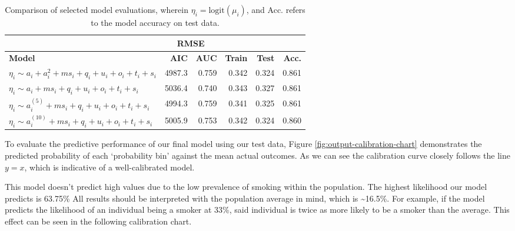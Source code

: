 \documentclass[
  11pt,
  twocolumn]{article}
\begin{document}
\begin{table}

\caption{\label{tab:outputmodelselectiontable}Comparison of selected model evaluations, wherein $\eta_i = \text{logit}(\mu_i)$, and Acc. refers to the model accuracy on test data.\label{tab:output-model-selection-table}}
\centering
\fontsize{7}{9}\selectfont
\begin{tabular}[t]{>{\raggedright\arraybackslash}p{9em}|r|r|r|r|r}
\hline
\multicolumn{3}{c|}{ } & \multicolumn{2}{c|}{RMSE} & \multicolumn{1}{c}{ } \\
\cline{4-5}
\textbf{Model} & \textbf{AIC} & \textbf{AUC} & \textbf{Train} & \textbf{Test} & \textbf{Acc.}\\
\hline
$\eta_i \sim a_i + a_i^2 + ms_i + q_i + u_i + o_i + t_i + s_i$ & 4987.3 & 0.759 & 0.342 & 0.324 & 0.861\\
\hline
$\eta_i \sim a_i + ms_i + q_i + u_i + o_i + t_i + s_i$ & 5036.4 & 0.740 & 0.343 & 0.327 & 0.861\\
\hline
$\eta_i \sim a_i^{(5)} + ms_i + q_i + u_i + o_i + t_i + s_i$ & 4994.3 & 0.759 & 0.341 & 0.325 & 0.861\\
\hline
$\eta_i \sim a_i^{(10)} + ms_i + q_i + u_i + o_i + t_i + s_i$ & 5005.9 & 0.753 & 0.342 & 0.324 & 0.860\\
\hline
\end{tabular}
\end{table}

To evaluate the predictive performance of our final model using our test
data, Figure \ref{fig:output-calibration-chart} demonstrates the
predicted probability of each `probability bin' against the mean actual
outcomes. As we can see the calibration curve closely follows the line
\(y = x\), which is indicative of a well-calibrated model.

This model doesn't predict high values due to the low prevalence of
smoking within the population. The highest likelihood our model predicts
is 63.75\% All results should be interpreted with the population average
in mind, which is \textasciitilde16.5\%. For example, if the model
predicts the likelihood of an individual being a smoker at 33\%, said
individual is twice as more likely to be a smoker than the average. This
effect can be seen in the following calibration chart.
\end{document}
